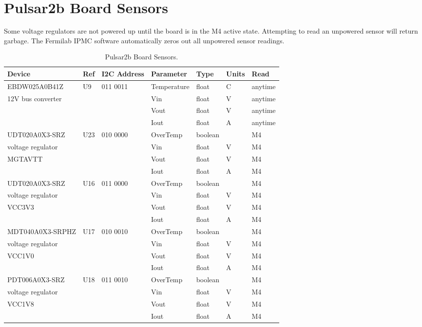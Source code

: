 \documentclass[letterpaper]{article}
\begin{document}
\newpage
\section{Pulsar2b Board Sensors}
\label{Appendix_Sensors}

Some voltage regulators are not powered up until the board is in the M4 active state.  Attempting to read an unpowered sensor will return garbage.  The Fermilab IPMC software automatically zeros out all unpowered sensor readings.

\begin{table}[htp]
\centering
\caption{Pulsar2b Board Sensors.}
\begin{tabular}{|l|l|l|l|l|l|l|} \hline
Device & Ref & I2C Address& Parameter & Type & Units & Read \\ \hline
\hline
EBDW025A0B41Z & U9& 011 0011 & Temperature & float & C & anytime \\ \cline{4-7}
12V bus converter&&&Vin&float&V&anytime \\ \cline{4-7}
&&&Vout&float&V&anytime \\ \cline{4-7}
&&&Iout&float&A&anytime \\ \hline
\hline
UDT020A0X3-SRZ&U23&010 0000&OverTemp&boolean&&M4 \\ \cline{4-7}
voltage regulator&&&Vin&float&V&M4 \\ \cline{4-7}
MGTAVTT&&&Vout&float&V&M4 \\ \cline{4-7}
&&&Iout&float&A&M4 \\ \hline
\hline
UDT020A0X3-SRZ&U16&011 0000&OverTemp&boolean&&M4 \\ \cline{4-7}
voltage regulator&&&Vin&float&V&M4 \\ \cline{4-7}
VCC3V3&&&Vout&float&V&M4 \\ \cline{4-7}
&&&Iout&float&A&M4 \\ \hline
\hline
MDT040A0X3-SRPHZ&U17&010 0010&OverTemp&boolean&&M4 \\ \cline{4-7}
voltage regulator&&&Vin&float&V&M4 \\ \cline{4-7}
VCC1V0&&&Vout&float&V&M4 \\ \cline{4-7}
&&&Iout&float&A&M4 \\ \hline
\hline
PDT006A0X3-SRZ&U18&011 0010&OverTemp&boolean&&M4 \\ \cline{4-7}
voltage regulator&&&Vin&float&V&M4 \\ \cline{4-7}
VCC1V8&&&Vout&float&V&M4 \\ \cline{4-7}
&&&Iout&float&A&M4 \\ \hline

\end{tabular}
\end{table}
\end{document}
